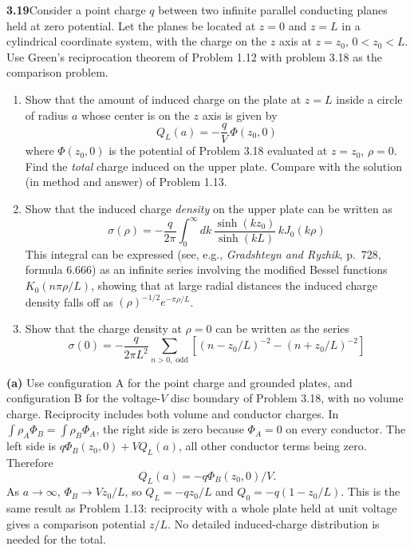 \par\bigskip
\noindent\textbf{3.19}\quad Consider a point charge $q$ between two infinite parallel conducting planes held at zero potential. Let the planes be located at $z=0$ and $z=L$ in a cylindrical coordinate system, with the charge on the $z$ axis at $z=z_{0}$, $0<z_{0}<L$. Use Green's reciprocation theorem of Problem 1.12 with problem 3.18 as the comparison problem.
\begin{enumerate}
\item[(a)] Show that the amount of induced charge on the plate at $z=L$ inside a circle of radius $a$ whose center is on the $z$ axis is given by
\[
Q_{L}(a)=-\frac{q}{V}\,\Phi(z_{0},0)
\]
where $\Phi(z_{0},0)$ is the potential of Problem 3.18 evaluated at $z=z_{0}$, $\rho=0$. Find the \emph{total} charge induced on the upper plate. Compare with the solution (in method and answer) of Problem 1.13.
\item[(b)] Show that the induced charge \emph{density} on the upper plate can be written as
\[
\sigma(\rho)=-\frac{q}{2\pi}\int_{0}^{\infty}dk\,\frac{\sinh(kz_{0})}{\sinh(kL)}\,kJ_{0}(k\rho)
\]
This integral can be expressed (see, e.g., \emph{Gradshteyn and Ryzhik}, p.~728, formula 6.666) as an infinite series involving the modified Bessel functions $K_{0}(n\pi\rho/L)$, showing that at large radial distances the induced charge density falls off as $(\rho)^{-1/2}e^{-\pi\rho/L}$.
\item[(c)] Show that the charge density at $\rho=0$ can be written as the series
\[
\sigma(0)=-\frac{q}{2\pi L^{2}}\sum_{n>0,\;\mathrm{odd}}\left[(n-z_{0}/L)^{-2}-(n+z_{0}/L)^{-2}\right]
\]
\end{enumerate}
\solution

\textbf{(a)} Use configuration A for the point charge and grounded
plates, and configuration B for the voltage-$V$ disc boundary of
Problem 3.18, with no volume charge.  Reciprocity includes both
volume and conductor charges.  In
$\int\rho_A\Phi_B=\int\rho_B\Phi_A$, the right side is zero
because $\Phi_A=0$ on every conductor.  The left side is
$q\Phi_B(z_0,0)+VQ_L(a)$, all other conductor terms being zero.
Therefore
\[
\boxed{Q_L(a)=-q\Phi_B(z_0,0)/V.}
\]
As $a\to\infty$, $\Phi_B\to Vz_0/L$, so
$Q_L=-qz_0/L$ and $Q_0=-q(1-z_0/L)$.
This is the same result as Problem 1.13: reciprocity with a whole
plate held at unit voltage gives a comparison potential $z/L$.
No detailed induced-charge distribution is needed for the total.

